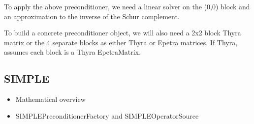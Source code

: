 To apply the above preconditioner, we need a linear solver on the
(0,0) block and an approximation to the inverse of the Schur
complement.

To build a concrete preconditioner object, we will also need a 2x2
block Thyra matrix or the 4 separate blocks as either Thyra or Epetra
matrices.  If Thyra, assumes each block is a Thyra EpetraMatrix.


\subsection{SIMPLE}
\begin{itemize}
\item Mathematical overview
\item SIMPLEPreconditionerFactory and SIMPLEOperatorSource
\end{itemize}
